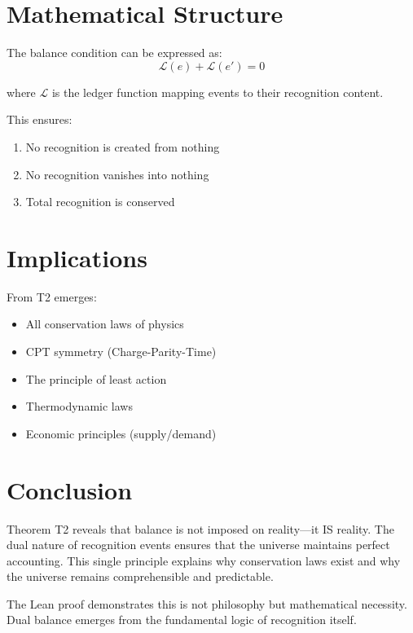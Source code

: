 \documentclass[11pt]{article}
\theoremstyle{definition}
\begin{document}
\section{Mathematical Structure}

The balance condition can be expressed as:
$$\mathcal{L}(e) + \mathcal{L}(e') = 0$$

where $\mathcal{L}$ is the ledger function mapping events to their recognition content.

This ensures:
\begin{enumerate}
    \item No recognition is created from nothing
    \item No recognition vanishes into nothing
    \item Total recognition is conserved
\end{enumerate}

\section{Implications}

From T2 emerges:
\begin{itemize}
    \item All conservation laws of physics
    \item CPT symmetry (Charge-Parity-Time)
    \item The principle of least action
    \item Thermodynamic laws
    \item Economic principles (supply/demand)
\end{itemize}

\section{Conclusion}

Theorem T2 reveals that balance is not imposed on reality—it IS reality. The dual nature of recognition events ensures that the universe maintains perfect accounting. This single principle explains why conservation laws exist and why the universe remains comprehensible and predictable.

The Lean proof demonstrates this is not philosophy but mathematical necessity. Dual balance emerges from the fundamental logic of recognition itself.
\end{document}
